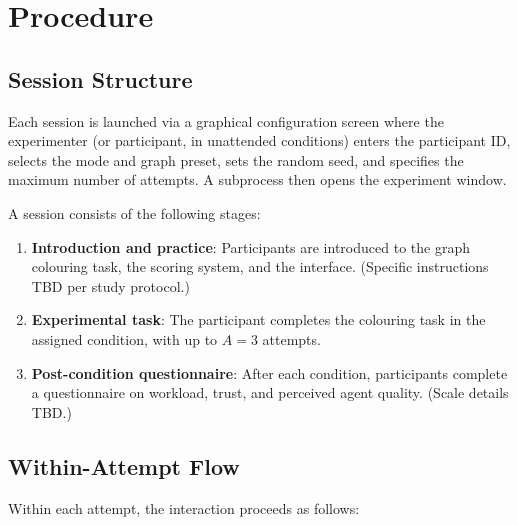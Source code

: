 \documentclass[11pt]{article}
\theoremstyle{definition}
\begin{document}
\section{Procedure}
\label{sec:procedure}

\subsection{Session Structure}

Each session is launched via a graphical configuration screen where the experimenter (or
participant, in unattended conditions) enters the participant ID, selects the mode and
graph preset, sets the random seed, and specifies the maximum number of attempts.  A
subprocess then opens the experiment window.

A session consists of the following stages:

\begin{enumerate}[nosep]
  \item \textbf{Introduction and practice}: Participants are introduced to the graph
    colouring task, the scoring system, and the interface.  (Specific instructions TBD
    per study protocol.)
  \item \textbf{Experimental task}: The participant completes the colouring task in the
    assigned condition, with up to $A = 3$ attempts.
  \item \textbf{Post-condition questionnaire}: After each condition, participants
    complete a questionnaire on workload, trust, and perceived agent quality.  (Scale
    details TBD.)
\end{enumerate}

\subsection{Within-Attempt Flow}

Within each attempt, the interaction proceeds as follows:
\end{document}
